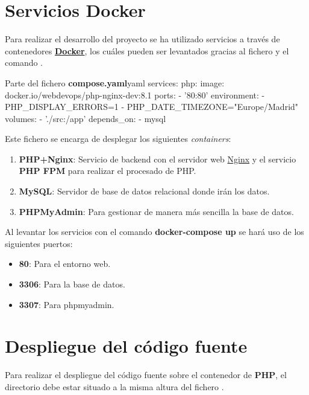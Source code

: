 \documentclass{\ClassPath/viu-tfm-template}
\begin{document}
\section{Servicios Docker}
Para realizar el desarrollo del proyecto se ha utilizado servicios a través de contenedores \textbf{\href{https://www.docker.com/}{Docker}}, los cuáles pueden ser levantados gracias al fichero  y el comando 
.


\begin{mycode}{Parte del fichero \textbf{compose.yaml}}{yaml}{}
services:
    php:
        image: docker.io/webdevops/php-nginx-dev:8.1
        ports:
            - '80:80'
        environment:
            - PHP_DISPLAY_ERRORS=1
            - PHP_DATE_TIMEZONE="Europe/Madrid"
        volumes:
            - './src:/app'
        depends_on:
            - mysql
\end{mycode}

Este fichero se encarga de desplegar los siguientes \textit{containers}:
\vspace{-1em}
\begin{enumerate}
    \item \textbf{PHP+Nginx}: Servicio de backend con el servidor web
    \href{https://nginx.org/}{Nginx} y el servicio \textbf{PHP FPM} para realizar el procesado de PHP.
    \item \textbf{MySQL}: Servidor de base de datos relacional donde irán los datos.
    \item \textbf{PHPMyAdmin}: Para gestionar de manera más sencilla la base de datos.
\end{enumerate}
\vspace{-1em}

Al levantar los servicios con el comando \textbf{docker-compose up} se hará uso de los siguientes puertos:
\vspace{-1em}
\begin{itemize}
    \item \textbf{80}: Para el entorno web.
    \item \textbf{3306}: Para la base de datos.
    \item \textbf{3307}: Para phpmyadmin.
\end{itemize}
\vspace{-1em}

\section{Despliegue del código fuente}
Para realizar el despliegue del código fuente sobre el contenedor de \textbf{PHP}, el directorio  debe estar situado a la misma altura del fichero .
\end{document}
